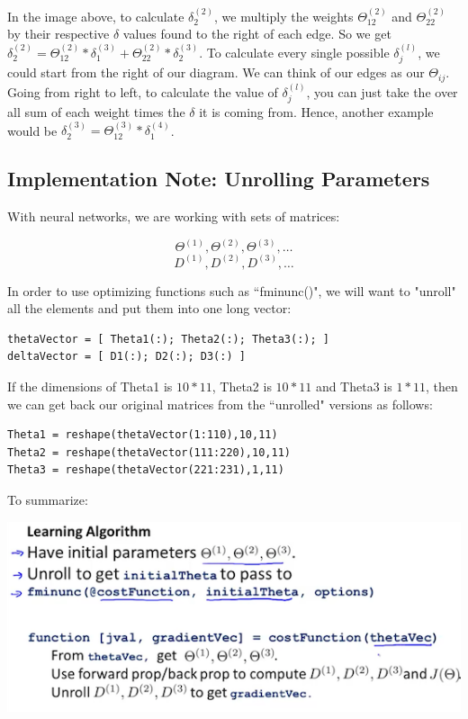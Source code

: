 \documentclass[UTF8]{article}
\begin{document}
In the image above, to calculate $\delta^{(2)}_2$, we multiply the weights $\Theta_{12}^{(2)}$ and $\Theta_{22}^{(2)}$ by their respective $\delta$ values found to the right of each edge. So we get $\delta_2^{(2)}=\Theta_{12}^{(2)}*\delta^{(3)}_1+\Theta_{22}^{(2)}*\delta^{(3)}_2$. To calculate every single possible $\delta^{(l)}_j$, we could start from the right of our diagram. We can think of our edges as our $\Theta_{ij}$. Going from right to left, to calculate the value of $\delta^{(l)}_j$, you can just take the over all sum of each weight times the $\delta$ it is coming from. Hence, another example would be $\delta_2^{(3)}=\Theta_{12}^{(3)}*\delta^{(4)}_1$.

\subsection{Implementation Note: Unrolling Parameters}

With neural networks, we are working with sets of matrices:

\[\Theta^{(1)}, \Theta^{(2)}, \Theta^{(3)}, \dots \]
\[D^{(1)}, D^{(2)}, D^{(3)}, \dots \]

In order to use optimizing functions such as ``fminunc()", we will want to "unroll" all the elements and put them into one long vector:

\begin{lstlisting}
thetaVector = [ Theta1(:); Theta2(:); Theta3(:); ]
deltaVector = [ D1(:); D2(:); D3(:) ]
\end{lstlisting}

If the dimensions of Theta1 is $10*11$, Theta2 is $10*11$ and Theta3 is $1*11$, then we can get back our original matrices from the ``unrolled" versions as follows:

\begin{lstlisting}
Theta1 = reshape(thetaVector(1:110),10,11)
Theta2 = reshape(thetaVector(111:220),10,11)
Theta3 = reshape(thetaVector(221:231),1,11)
\end{lstlisting}

To summarize:

\includegraphics[width = \textwidth]{NotePics/9_4_1.png}
\end{document}
